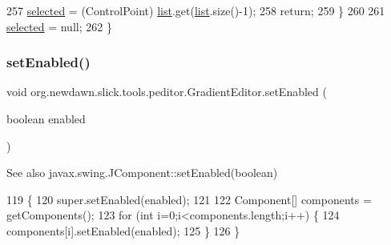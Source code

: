 \begin{DoxyCode}
257             \mbox{\hyperlink{classorg_1_1newdawn_1_1slick_1_1tools_1_1peditor_1_1_gradient_editor_a54ab0ad96c4492a2ccfd517dfcfe535b}{selected}} = (ControlPoint) \mbox{\hyperlink{classorg_1_1newdawn_1_1slick_1_1tools_1_1peditor_1_1_gradient_editor_aa53704ef8438035eb76c8c6aab8af133}{list}}.get(\mbox{\hyperlink{classorg_1_1newdawn_1_1slick_1_1tools_1_1peditor_1_1_gradient_editor_aa53704ef8438035eb76c8c6aab8af133}{list}}.size()-1);
258             \textcolor{keywordflow}{return};
259         \}
260         
261         \mbox{\hyperlink{classorg_1_1newdawn_1_1slick_1_1tools_1_1peditor_1_1_gradient_editor_a54ab0ad96c4492a2ccfd517dfcfe535b}{selected}} = null;
262     \}
\end{DoxyCode}
\mbox{\label{classorg_1_1newdawn_1_1slick_1_1tools_1_1peditor_1_1_gradient_editor_a651cd84461a9a820c44991be64aced5b}} 
\subsubsection{\texorpdfstring{set\+Enabled()}{setEnabled()}}
{\footnotesize\ttfamily void org.\+newdawn.\+slick.\+tools.\+peditor.\+Gradient\+Editor.\+set\+Enabled (\begin{DoxyParamCaption}\item[{boolean}]{enabled }\end{DoxyParamCaption})\hspace{0.3cm}{\ttfamily [inline]}}

\begin{DoxySeeAlso}{See also}
javax.\+swing.\+J\+Component\+::set\+Enabled(boolean) 
\end{DoxySeeAlso}

\begin{DoxyCode}
119                                             \{
120         super.setEnabled(enabled);
121         
122         Component[] components = getComponents();
123         \textcolor{keywordflow}{for} (\textcolor{keywordtype}{int} i=0;i<components.length;i++) \{
124             components[i].setEnabled(enabled);
125         \}
126     \}
\end{DoxyCode}
\mbox{\label{classorg_1_1newdawn_1_1slick_1_1tools_1_1peditor_1_1_gradient_editor_a661c1384fa5d5355fafbf1df4c9828a6}} 
